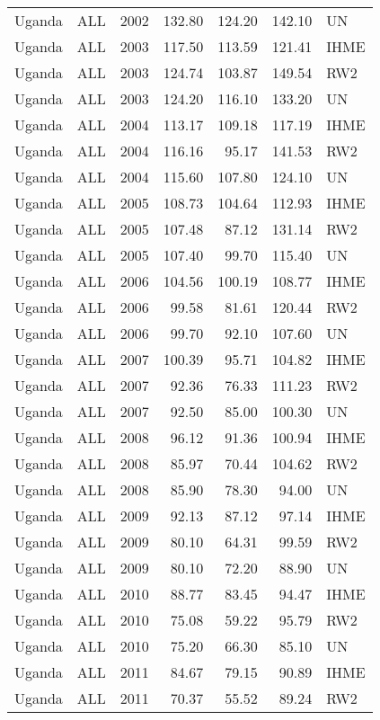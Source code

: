 \begin{longtable}{lllrrrl}
  Uganda & ALL & 2002 & 132.80 & 124.20 & 142.10 & UN \\ 
  Uganda & ALL & 2003 & 117.50 & 113.59 & 121.41 & IHME \\ 
  Uganda & ALL & 2003 & 124.74 & 103.87 & 149.54 & RW2 \\ 
  Uganda & ALL & 2003 & 124.20 & 116.10 & 133.20 & UN \\ 
  Uganda & ALL & 2004 & 113.17 & 109.18 & 117.19 & IHME \\ 
  Uganda & ALL & 2004 & 116.16 & 95.17 & 141.53 & RW2 \\ 
  Uganda & ALL & 2004 & 115.60 & 107.80 & 124.10 & UN \\ 
  Uganda & ALL & 2005 & 108.73 & 104.64 & 112.93 & IHME \\ 
  Uganda & ALL & 2005 & 107.48 & 87.12 & 131.14 & RW2 \\ 
  Uganda & ALL & 2005 & 107.40 & 99.70 & 115.40 & UN \\ 
  Uganda & ALL & 2006 & 104.56 & 100.19 & 108.77 & IHME \\ 
  Uganda & ALL & 2006 & 99.58 & 81.61 & 120.44 & RW2 \\ 
  Uganda & ALL & 2006 & 99.70 & 92.10 & 107.60 & UN \\ 
  Uganda & ALL & 2007 & 100.39 & 95.71 & 104.82 & IHME \\ 
  Uganda & ALL & 2007 & 92.36 & 76.33 & 111.23 & RW2 \\ 
  Uganda & ALL & 2007 & 92.50 & 85.00 & 100.30 & UN \\ 
  Uganda & ALL & 2008 & 96.12 & 91.36 & 100.94 & IHME \\ 
  Uganda & ALL & 2008 & 85.97 & 70.44 & 104.62 & RW2 \\ 
  Uganda & ALL & 2008 & 85.90 & 78.30 & 94.00 & UN \\ 
  Uganda & ALL & 2009 & 92.13 & 87.12 & 97.14 & IHME \\ 
  Uganda & ALL & 2009 & 80.10 & 64.31 & 99.59 & RW2 \\ 
  Uganda & ALL & 2009 & 80.10 & 72.20 & 88.90 & UN \\ 
  Uganda & ALL & 2010 & 88.77 & 83.45 & 94.47 & IHME \\ 
  Uganda & ALL & 2010 & 75.08 & 59.22 & 95.79 & RW2 \\ 
  Uganda & ALL & 2010 & 75.20 & 66.30 & 85.10 & UN \\ 
  Uganda & ALL & 2011 & 84.67 & 79.15 & 90.89 & IHME \\ 
  Uganda & ALL & 2011 & 70.37 & 55.52 & 89.24 & RW2 \\ 

\end{longtable}
